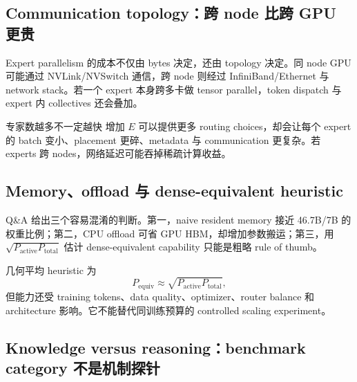 
\subsection{Communication topology：跨 node 比跨 GPU 更贵}

Expert parallelism 的成本不仅由 bytes 决定，还由 topology 决定。同 node GPU 可能通过 NVLink/NVSwitch 通信，跨 node 则经过 InfiniBand/Ethernet 与 network stack。若一个 expert 本身跨多卡做 tensor parallel，token dispatch 与 expert 内 collectives 还会叠加。

\begin{warningbox}{专家数越多不一定越快}
增加 $E$ 可以提供更多 routing choices，却会让每个 expert 的 batch 变小、placement 更碎、metadata 与 communication 更复杂。若 experts 跨 nodes，网络延迟可能吞掉稀疏计算收益。
\end{warningbox}


\subsection{Memory、offload 与 dense-equivalent heuristic}

Q\&A 给出三个容易混淆的判断。第一，naive resident memory 接近 46.7B/7B 的权重比例；第二，CPU offload 可省 GPU HBM，却增加参数搬运；第三，用 $\sqrt{P_{\text{active}}P_{\text{total}}}$ 估计 dense-equivalent capability 只能是粗略 rule of thumb。

几何平均 heuristic 为
\[
P_{\text{equiv}}\approx \sqrt{P_{\text{active}}P_{\text{total}}},
\]
但能力还受 training tokens、data quality、optimizer、router balance 和 architecture 影响。它不能替代同训练预算的 controlled scaling experiment。


\subsection{Knowledge versus reasoning：benchmark category 不是机制探针}


